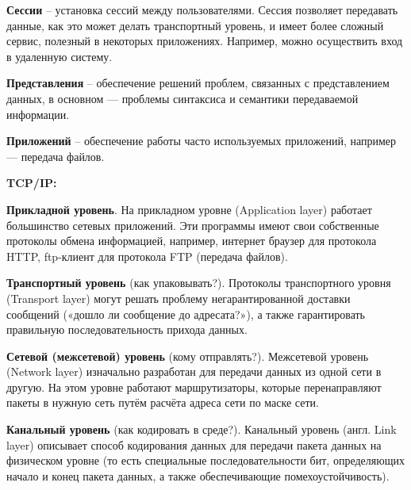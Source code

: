 \textbf{Сессии} -- установка сессий между пользователями. Сессия позволяет передавать данные, как это может делать транспортный уровень, и имеет более сложный сервис, полезный в некоторых приложениях. Например, можно осуществить вход в удаленную систему.

\textbf{Представления} -- обеспечение решений проблем, связанных с представлением данных, в основном — проблемы синтаксиса и семантики передаваемой информации.

\textbf{Приложений} -- обеспечение работы часто используемых приложений, например — передача файлов.



\bigbreak
\textbf{TCP/IP:}

\textbf{Прикладной уровень}.
На прикладном уровне (Application layer) работает большинство сетевых приложений.
Эти программы имеют свои собственные протоколы обмена информацией, например, интернет браузер для протокола HTTP, ftp-клиент для протокола FTP (передача файлов).

\textbf{Транспортный уровень} (как упаковывать?).
Протоколы транспортного уровня (Transport layer) могут решать проблему негарантированной доставки сообщений («дошло ли сообщение до адресата?»), а также гарантировать правильную последовательность прихода данных.

\textbf{Сетевой (межсетевой) уровень} (кому отправлять?).
Межсетевой уровень (Network layer) изначально разработан для передачи данных из одной сети в другую. На этом уровне работают маршрутизаторы, которые перенаправляют пакеты в нужную сеть путём расчёта адреса сети по маске сети.

\textbf{Канальный уровень} (как кодировать в среде?).
Канальный уровень (англ. Link layer) описывает способ кодирования данных для передачи пакета данных на физическом уровне (то есть специальные последовательности бит, определяющих начало и конец пакета данных, а также обеспечивающие помехоустойчивость).




